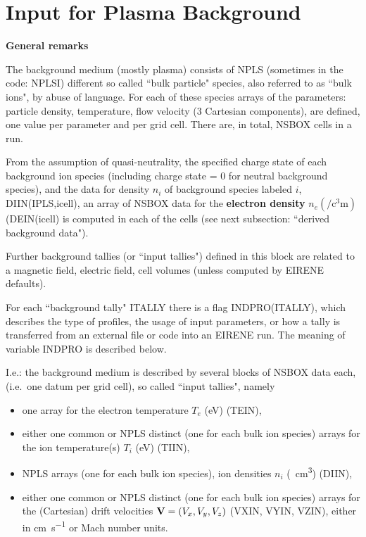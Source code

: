 \section{Input for Plasma Background} \label{sec2.5}

\textbf{General remarks} 

\medskip 

The background medium (mostly plasma) consists of NPLS (sometimes in the code:
NPLSI) different so called ``bulk particle" species, also referred to as ``bulk
ions", by abuse of language.
For each of these species arrays of the parameters: particle density,
temperature, flow velocity (3 Cartesian components),  are defined, one value
per parameter and per grid cell.
There are, in total, NSBOX cells in a run.

From the assumption of quasi-neutrality, the specified charge state of each
background ion species (including  charge state = 0 for neutral background
species), and the data for density $n_i$ of background species labeled $i$,
DIIN(IPLS,icell), an array of NSBOX data for the \textbf{electron density} $n_e
  (\si{\per\cubic\centi\metre} )$ (DEIN(icell) is computed in each of the cells
(see next subsection: ``derived background data").

Further background tallies (or ``input tallies") defined in this block are
related to a magnetic field, electric field, cell volumes (unless computed by
EIRENE defaults).

For each ``background tally" ITALLY there is a flag INDPRO(ITALLY), which
describes the type of profiles, the usage of input parameters, or how a tally
is transferred from an external file or code into an EIRENE run.
The meaning of variable INDPRO is described below.

I.e.: the background medium is described by several blocks of NSBOX data each,
(i.e.\ one datum per grid cell), so called ``input tallies", namely
\begin{itemize}
  \item one array for the electron temperature $T_e$
        (\si{\electronvolt}) (TEIN),
  \item either one common or NPLS distinct (one for
        each bulk ion species) arrays for the ion temperature(s) $T_i$
        (\si{\electronvolt}) (TIIN),
  \item NPLS arrays (one for each bulk ion species),
        ion densities $n_i$ (\si{\per\cubic\centi\metre}) (DIIN),
  \item either one
        common or NPLS distinct (one for each bulk ion species) arrays for the
        (Cartesian) drift velocities $\mathbf{V} = ( V_x, V_y, V_z )$ (VXIN, VYIN, VZIN),
        either in \si{\centi\metre\per\second} or Mach number units.
\end{itemize}

